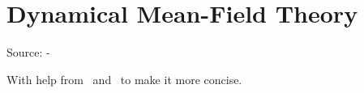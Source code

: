 \chapter{Dynamical Mean-Field Theory}\label{ch:dynamical-mean-field-theory}

Source: \citeauthor{Georges_Kotliar_Krauth_Rozenberg_1996} -~~\cite{Georges_Kotliar_Krauth_Rozenberg_1996}

With help from~\cite{Schüler} and~\cite{Werner} to make it more concise.


